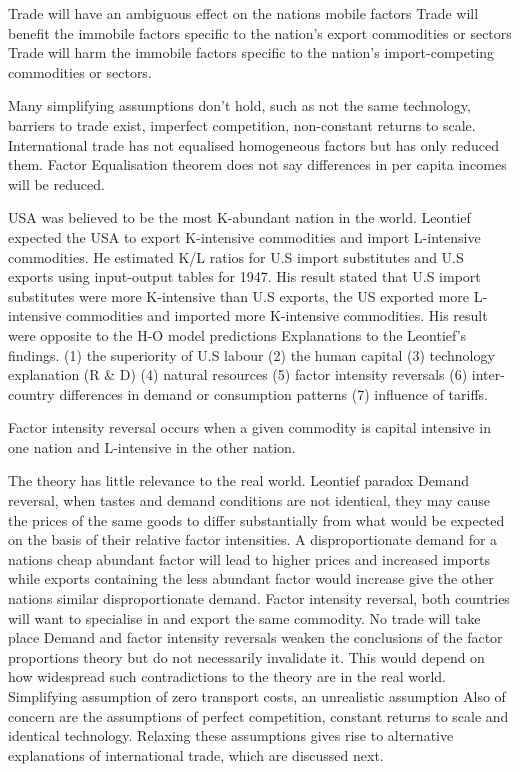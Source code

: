 \documentclass[12pt]{examnotes}
\begin{document}
\ra Trade will have an ambiguous effect on the nations mobile factors
\ra Trade will benefit the immobile factors specific to the nation's export commodities or sectors
\ra Trade will harm the immobile factors specific to the nation's import-competing commodities or sectors.

\ra Many simplifying assumptions don't hold, such as not the same technology, barriers to trade exist, imperfect competition, non-constant returns to scale.
\ra International trade has not equalised homogeneous factors but has only reduced them.
\ra Factor Equalisation theorem does not say differences in per capita incomes will be reduced.

\ra USA was believed to be the most K-abundant nation in the world. Leontief expected the USA to export K-intensive commodities and import L-intensive commodities. 
\ra He estimated K/L ratios for U.S import substitutes and U.S exports using input-output tables for 1947. 
\ra His result stated that U.S import substitutes were more K-intensive than U.S exports, the US  exported more L-intensive commodities and imported more K-intensive commodities. 
\ra His result were opposite to the H-O model predictions
\ra Explanations to the Leontief’s findings.  
(1) the superiority of U.S labour
(2) the human capital
(3) technology explanation (R \& D)
(4) natural resources
(5) factor intensity reversals
(6) inter-country differences in demand or consumption patterns
(7) influence of tariffs.

Factor intensity reversal occurs when a given commodity is capital intensive in one nation and L-intensive in the other nation.

\ra The theory has little relevance to the real world. 
\ra Leontief paradox 
\ra Demand reversal, when tastes and demand conditions are not identical, they may cause the prices of the same goods to differ substantially from what would be expected on the basis of their relative factor intensities. A disproportionate demand for a nations cheap abundant factor will lead to higher prices and increased imports while exports containing the less abundant factor would increase give the other nations similar disproportionate demand.
\ra Factor intensity reversal, both countries will want to specialise in and export the same commodity. No trade will take place
\ra Demand and factor intensity reversals weaken the conclusions of the factor proportions theory but do not necessarily invalidate it. This would depend on how widespread such contradictions to the theory are in the real world. 
\ra Simplifying assumption of zero transport costs, an unrealistic assumption
\ra Also of concern are the assumptions of perfect competition, constant returns to scale and identical technology. Relaxing these assumptions gives rise to alternative explanations of international trade, which are discussed next.
\end{document}
